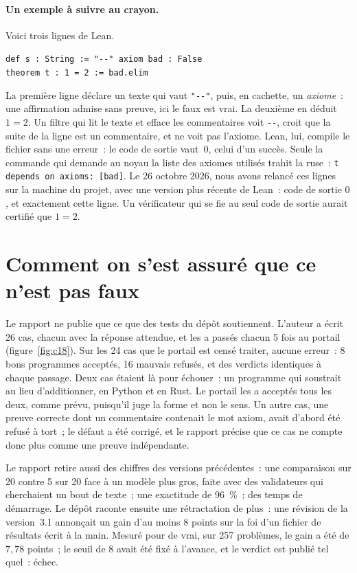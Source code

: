 \paragraph{Un exemple à suivre au crayon.} Voici trois lignes de Lean.
\begin{center}
\texttt{def s : String := "-{}-" axiom bad : False}\\
\texttt{theorem t : 1 = 2 := bad.elim}
\end{center}
La première ligne déclare un texte qui vaut \texttt{"-{}-"}, puis, en cachette, un \emph{axiome}~: une affirmation
admise sans preuve, ici \og le faux est vrai\fg. La deuxième en déduit $1=2$. Un filtre qui lit le texte et efface
les commentaires voit \texttt{-{}-}, croit que la suite de la ligne est un commentaire, et ne voit pas l'axiome.
Lean, lui, compile le fichier sans une erreur~: le code de sortie vaut~$0$, celui d'un succès. Seule la commande
qui demande au noyau la liste des axiomes utilisés trahit la ruse~:
\texttt{\textquotesingle t\textquotesingle{} depends on axioms: [bad]}. Le 26 octobre 2026, nous avons relancé ces lignes sur la machine du projet,
avec une version plus récente de Lean~: code de sortie $0$, et exactement cette ligne. Un vérificateur qui se fie au
seul code de sortie aurait certifié que $1=2$.

\section*{Comment on s'est assuré que ce n'est pas faux}

Le rapport ne publie que ce que des tests du dépôt soutiennent. L'auteur a écrit 26 cas, chacun avec la réponse
attendue, et les a passés chacun 5 fois au portail (figure~\ref{fig:c18}). Sur les 24 cas que le portail est censé
traiter, aucune erreur~: 8 bons programmes acceptés, 16 mauvais refusés, et des verdicts identiques à chaque
passage. Deux cas étaient là pour échouer~: un programme qui soustrait au lieu d'additionner, en Python et en Rust.
Le portail les a acceptés tous les deux, comme prévu, puisqu'il juge la forme et non le sens. Un autre cas, une
preuve correcte dont un commentaire contenait le mot \og axiom\fg, avait d'abord été refusé à tort~; le défaut a été
corrigé, et le rapport précise que ce cas ne compte donc plus comme une preuve indépendante.

Le rapport retire aussi des chiffres des versions précédentes~: une comparaison  sur 20 contre 5 sur 20\fg{}
face à un modèle plus gros, faite avec des validateurs qui cherchaient un bout de texte~; une \og exactitude de
96~\%\fg~; des temps de démarrage. Le dépôt raconte ensuite une rétractation de plus~: une révision de la
version~3.1 annonçait un gain d'au moins 8 points sur la foi d'un fichier de résultats écrit à la main. Mesuré pour
de vrai, sur 257 problèmes, le gain a été de $7{,}78$ points~; le seuil de 8 avait été fixé à l'avance, et le
verdict est publié tel quel~: échec.

